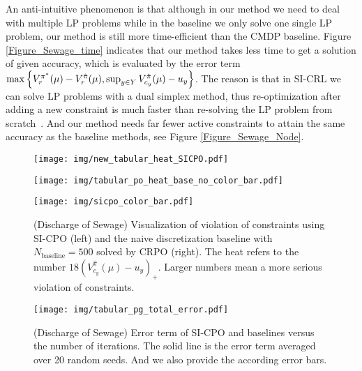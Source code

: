 An anti-intuitive phenomenon is that although in our method we need to deal with multiple LP problems while in the baseline we only solve one single LP problem, our method is still more time-efficient than the CMDP baseline.
Figure \ref{Figure_Sewage_time} indicates that our method takes less time to get a solution of given accuracy, which is evaluated by the error term $\max\left\{{V^{\pi^*}_r(\mu)-V^{\hat\pi}_r(\mu),\sup_{y\in Y}V_{c_y}^{\hat \pi}(\mu)-u_y}\right\}$.
The reason is that in SI-CRL we can solve LP problems with a dual simplex method, thus re-optimization after adding a new constraint is much faster than re-solving the LP problem from scratch~\citep{koberstein2005dual}.
And our method needs far fewer active constraints to attain the same accuracy as the baseline methods, see Figure \ref{Figure_Sewage_Node}.

\begin{figure}[htbp]
\begin{minipage}[t]{0.45\linewidth}
    \centering
        \vspace{0cm}
    \texttt{[image: img/new\_tabular\_heat\_SICPO.pdf]}
\end{minipage}
\begin{minipage}[t]{0.45\linewidth}
    \centering
        \vspace{0cm}
    \texttt{[image: img/tabular\_po\_heat\_base\_no\_color\_bar.pdf]}
\end{minipage}
\begin{minipage}[t]{0.08\linewidth}
    \centering
        \vspace{0cm}
    \texttt{[image: img/sicpo\_color\_bar.pdf]}
\end{minipage}
    \caption{(Discharge of Sewage) Visualization of violation of constraints using SI-CPO (left) and the naive discretization baseline with $N_{\text{baseline}}=500$ solved by CRPO (right). The heat refers to the number $18(V^{\hat\pi}_{c_y}(\mu)-u_y)_+$. Larger numbers mean a more serious violation of constraints.}
    \label{Figure_Sewage_Heat_PG}    
\end{figure}

\begin{figure}[htb]
\begin{minipage}[htb]{0.96\linewidth}
    \centering
    \texttt{[image: img/tabular\_pg\_total\_error.pdf]}
    \caption{(Discharge of Sewage) Error term of SI-CPO and baselines versus the number of iterations.
    The solid line is the error term averaged over 20 random seeds.
    And we also provide the according error bars.}
    \label{Figure_Sewage_SICPO_Node}  
\end{minipage}
\end{figure}



